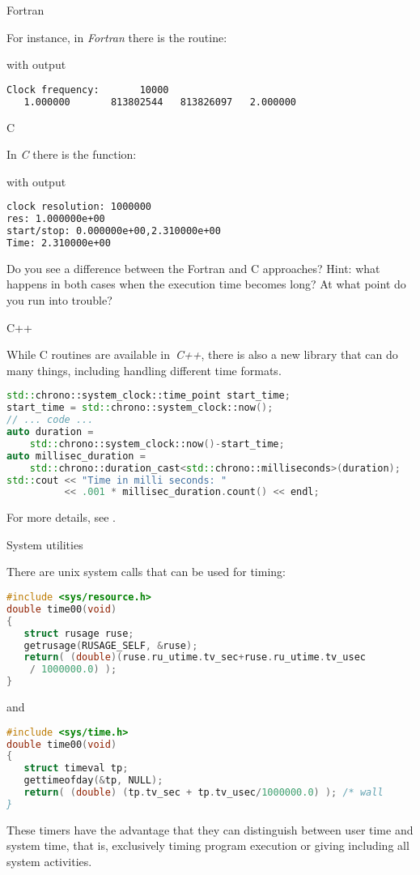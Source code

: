  {Fortran}

For instance, in \emph{Fortran} there is the 
routine:

with output
\begin{lstlisting}[language=bash]
 Clock frequency:       10000
   1.000000       813802544   813826097   2.000000  
\end{lstlisting}

 {C}

In \emph{C} there is the  function:

with output
\begin{lstlisting}[language=bash]
clock resolution: 1000000
res: 1.000000e+00
start/stop: 0.000000e+00,2.310000e+00
Time: 2.310000e+00
\end{lstlisting}
Do you see a difference between the Fortran and C approaches? Hint:
what happens in both cases when the execution time becomes long? At
what point do you run into trouble?

 {C++}

While C routines are available in~\emph{C++}, there is also a new
 library that can do many things, including
handling different time formats.
\begin{lstlisting}[language=c++]
std::chrono::system_clock::time_point start_time;
start_time = std::chrono::system_clock::now();
// ... code ...
auto duration =
    std::chrono::system_clock::now()-start_time;
auto millisec_duration =
    std::chrono::duration_cast<std::chrono::milliseconds>(duration);
std::cout << "Time in milli seconds: " 
          << .001 * millisec_duration.count() << endl;
\end{lstlisting}
For more details, see .

 {System utilities}

There are unix system calls that can be used for timing:
\begin{lstlisting}[language=c++]
#include <sys/resource.h>                        
double time00(void)                              
{                                                
   struct rusage ruse;
   getrusage(RUSAGE_SELF, &ruse);
   return( (double)(ruse.ru_utime.tv_sec+ruse.ru_utime.tv_usec
    / 1000000.0) );
}
\end{lstlisting}
and 
\begin{lstlisting}[language=c++]
#include <sys/time.h>
double time00(void)
{
   struct timeval tp;
   gettimeofday(&tp, NULL);
   return( (double) (tp.tv_sec + tp.tv_usec/1000000.0) ); /* wall
}
\end{lstlisting}
These timers have the advantage that they can
distinguish between user time and system time, that is, exclusively
timing program execution or giving 
including all system activities.

